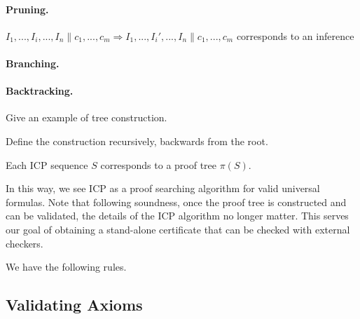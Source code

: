 \documentclass[envcountsect]{llncs}
\begin{document}
\paragraph{Pruning.}
$I_1,...,I_i,...,I_n \parallel c_1,...,c_m \Longrightarrow
I_1,...,I_i',...,I_n\parallel c_1,...,c_m$
corresponds to an inference
\paragraph{Branching.}

\paragraph{Backtracking.}

\begin{example}
Give an example of tree construction. 
\end{example}

\begin{definition}
Define the construction recursively, backwards from the root. 
\end{definition}

\begin{theorem}[ST-Correspondence]
Each ICP sequence $S$ corresponds to a proof tree $\pi(S)$.
\end{theorem}

In this way, we see ICP as a proof searching algorithm for valid universal
formulas. Note that following soundness, once the proof tree is constructed and
can be validated, the details of the ICP algorithm no longer matter. This serves
our goal of obtaining a stand-alone certificate that can be checked with
external checkers. 

\begin{definition}
We have the following rules. 

\end{definition}


\subsection{Validating Axioms}
\end{document}
